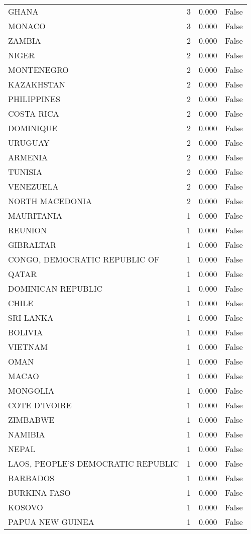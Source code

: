 \begin{tabular}{lrrr}
GHANA & 3 & 0.000 & False \\
MONACO & 3 & 0.000 & False \\
ZAMBIA & 2 & 0.000 & False \\
NIGER & 2 & 0.000 & False \\
MONTENEGRO & 2 & 0.000 & False \\
KAZAKHSTAN & 2 & 0.000 & False \\
PHILIPPINES & 2 & 0.000 & False \\
COSTA RICA & 2 & 0.000 & False \\
DOMINIQUE & 2 & 0.000 & False \\
URUGUAY & 2 & 0.000 & False \\
ARMENIA & 2 & 0.000 & False \\
TUNISIA & 2 & 0.000 & False \\
VENEZUELA & 2 & 0.000 & False \\
NORTH MACEDONIA & 2 & 0.000 & False \\
MAURITANIA & 1 & 0.000 & False \\
REUNION & 1 & 0.000 & False \\
GIBRALTAR & 1 & 0.000 & False \\
CONGO, DEMOCRATIC REPUBLIC OF & 1 & 0.000 & False \\
QATAR & 1 & 0.000 & False \\
DOMINICAN REPUBLIC & 1 & 0.000 & False \\
CHILE & 1 & 0.000 & False \\
SRI LANKA & 1 & 0.000 & False \\
BOLIVIA & 1 & 0.000 & False \\
VIETNAM & 1 & 0.000 & False \\
OMAN & 1 & 0.000 & False \\
MACAO & 1 & 0.000 & False \\
MONGOLIA & 1 & 0.000 & False \\
COTE D'IVOIRE & 1 & 0.000 & False \\
ZIMBABWE & 1 & 0.000 & False \\
NAMIBIA & 1 & 0.000 & False \\
NEPAL & 1 & 0.000 & False \\
LAOS, PEOPLE'S DEMOCRATIC REPUBLIC & 1 & 0.000 & False \\
BARBADOS & 1 & 0.000 & False \\
BURKINA FASO & 1 & 0.000 & False \\
KOSOVO & 1 & 0.000 & False \\
PAPUA NEW GUINEA & 1 & 0.000 & False \\

\end{tabular}

